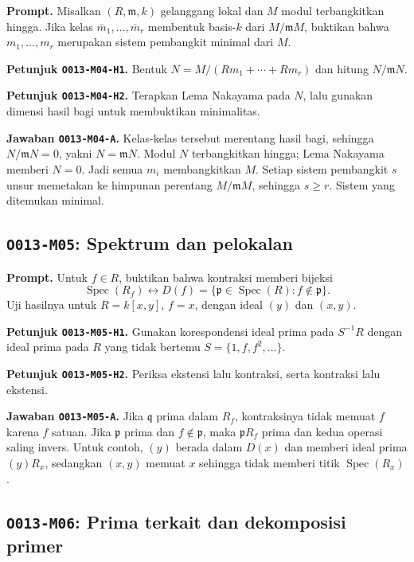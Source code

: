 \documentclass[11pt,a4paper]{article}
\newcommand{\oid}[1]{\texttt{#1}}
\begin{document}
\textbf{Prompt.} Misalkan $(R,\mathfrak m,k)$ gelanggang lokal dan $M$ modul
terbangkitkan hingga. Jika kelas $\overline m_1,\ldots,\overline m_r$ membentuk
basis-$k$ dari $M/\mathfrak mM$, buktikan bahwa $m_1,\ldots,m_r$ merupakan
sistem pembangkit minimal dari $M$.

\textbf{Petunjuk \oid{O013-M04-H1}.} Bentuk $N=M/(Rm_1+\cdots+Rm_r)$ dan
hitung $N/\mathfrak mN$.

\textbf{Petunjuk \oid{O013-M04-H2}.} Terapkan Lema Nakayama pada $N$, lalu
gunakan dimensi hasil bagi untuk membuktikan minimalitas.

\textbf{Jawaban \oid{O013-M04-A}.} Kelas-kelas tersebut merentang hasil bagi,
sehingga $N/\mathfrak mN=0$, yakni $N=\mathfrak mN$. Modul $N$ terbangkitkan
hingga; Lema Nakayama memberi $N=0$. Jadi semua $m_i$ membangkitkan $M$.
Setiap sistem pembangkit $s$ unsur memetakan ke himpunan perentang
$M/\mathfrak mM$, sehingga $s\ge r$. Sistem yang ditemukan minimal.

\subsection*{\oid{O013-M05}: Spektrum dan pelokalan}

\textbf{Prompt.} Untuk $f\in R$, buktikan bahwa kontraksi memberi bijeksi
\[
\operatorname{Spec}(R_f)\longleftrightarrow
D(f)=\{\mathfrak p\in\operatorname{Spec}(R):f\notin\mathfrak p\}.
\]
Uji hasilnya untuk $R=k[x,y]$, $f=x$, dengan ideal $(y)$ dan $(x,y)$.

\textbf{Petunjuk \oid{O013-M05-H1}.} Gunakan korespondensi ideal prima pada
$S^{-1}R$ dengan ideal prima pada $R$ yang tidak bertemu $S=\{1,f,f^2,\ldots\}$.

\textbf{Petunjuk \oid{O013-M05-H2}.} Periksa ekstensi lalu kontraksi, serta
kontraksi lalu ekstensi.

\textbf{Jawaban \oid{O013-M05-A}.} Jika $\mathfrak q$ prima dalam $R_f$,
kontraksinya tidak memuat $f$ karena $f$ satuan. Jika $\mathfrak p$ prima dan
$f\notin\mathfrak p$, maka $\mathfrak pR_f$ prima dan kedua operasi saling
invers. Untuk contoh, $(y)$ berada dalam $D(x)$ dan memberi ideal prima
$(y)R_x$, sedangkan $(x,y)$ memuat $x$ sehingga tidak memberi titik
$\operatorname{Spec}(R_x)$.

\subsection*{\oid{O013-M06}: Prima terkait dan dekomposisi primer}
\end{document}
